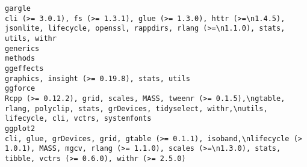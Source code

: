 \documentclass[
  letterpaper,
  DIV=11,
  numbers=noendperiod]{scrreprt}
\begin{document}
\begin{verbatim}
gargle                                                                                                                                                                                                                                                                                                                                                                                                                                                                    cli (>= 3.0.1), fs (>= 1.3.1), glue (>= 1.3.0), httr (>=\n1.4.5), jsonlite, lifecycle, openssl, rappdirs, rlang (>=\n1.1.0), stats, utils, withr
generics                                                                                                                                                                                                                                                                                                                                                                                                                                                                                                                                                                                                           methods
ggeffects                                                                                                                                                                                                                                                                                                                                                                                                                                                                                                                                                                      graphics, insight (>= 0.19.8), stats, utils
ggforce                                                                                                                                                                                                                                                                                                                                                                                                                                                 Rcpp (>= 0.12.2), grid, scales, MASS, tweenr (>= 0.1.5),\ngtable, rlang, polyclip, stats, grDevices, tidyselect, withr,\nutils, lifecycle, cli, vctrs, systemfonts
ggplot2                                                                                                                                                                                                                                                                                                                                                                                                                                  cli, glue, grDevices, grid, gtable (>= 0.1.1), isoband,\nlifecycle (> 1.0.1), MASS, mgcv, rlang (>= 1.1.0), scales (>=\n1.3.0), stats, tibble, vctrs (>= 0.6.0), withr (>= 2.5.0)

\end{verbatim}
\end{document}
